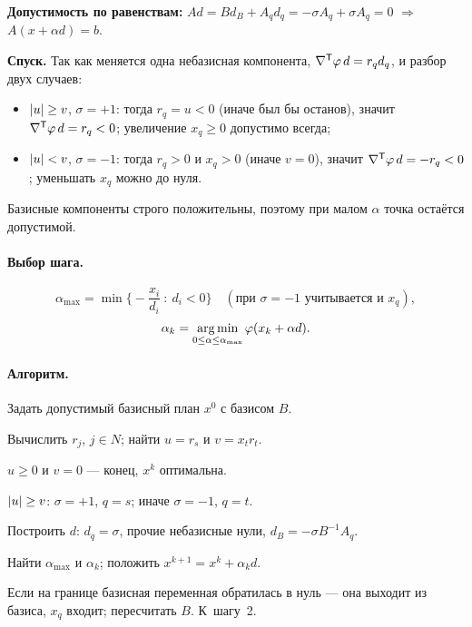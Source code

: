 \textbf{Допустимость по равенствам:}
$Ad = Bd_B + A_q d_q = -\sigma A_q + \sigma A_q = 0$ $\Rightarrow$
$A(x + \alpha d) = b$.

\textbf{Спуск.} Так как меняется одна небазисная компонента,
$\nabla^{\mathsf{T}}\varphi\,d = r_q d_q$, и разбор двух случаев:
\begin{itemize}[nosep,left=0pt]
  \item $\left\lvert u \right\rvert \ge v$, $\sigma = +1$: тогда $r_q = u < 0$ (иначе был бы
        останов), значит $\nabla^{\mathsf{T}}\varphi\,d = r_q < 0$; увеличение $x_q \ge 0$
        допустимо всегда;
  \item $\left\lvert u \right\rvert < v$, $\sigma = -1$: тогда $r_q > 0$ и $x_q > 0$ (иначе
        $v = 0$), значит $\nabla^{\mathsf{T}}\varphi\,d = -r_q < 0$; уменьшать $x_q$ можно
        до нуля.
\end{itemize}
Базисные компоненты строго положительны, поэтому при малом $\alpha$ точка
остаётся допустимой.

\paragraph{Выбор шага.}
\[
  \alpha_{\max} = \min\Big\{ -\frac{x_i}{d_i} \ :\ d_i < 0 \Big\}
  \quad(\text{при } \sigma = -1 \text{ учитывается и } x_q) ,
\]
\[
  \alpha_k = \operatorname*{arg\,min}_{0 \le \alpha \le \alpha_{\max}} \varphi(x_k + \alpha d) .
\]

\paragraph{Алгоритм.}
\begin{csteps}
  \item Задать допустимый базисный план $x^0$ с базисом $B$.
  \item Вычислить $r_j$, $j \in N$; найти $u = r_s$ и $v = x_t r_t$.
  \item $u \ge 0$ и $v = 0$ — конец, $x^k$ оптимальна.
  \item $\left\lvert u \right\rvert \ge v$: $\sigma = +1$, $q = s$; иначе $\sigma = -1$, $q = t$.
  \item Построить $d$: $d_q = \sigma$, прочие небазисные нули,
        $d_B = -\sigma B^{-1}A_q$.
  \item Найти $\alpha_{\max}$ и $\alpha_k$; положить
        $x^{k+1} = x^k + \alpha_k d$.
  \item Если на границе базисная переменная обратилась в нуль — она выходит из
        базиса, $x_q$ входит; пересчитать $B$. К~шагу~2.
\end{csteps}

